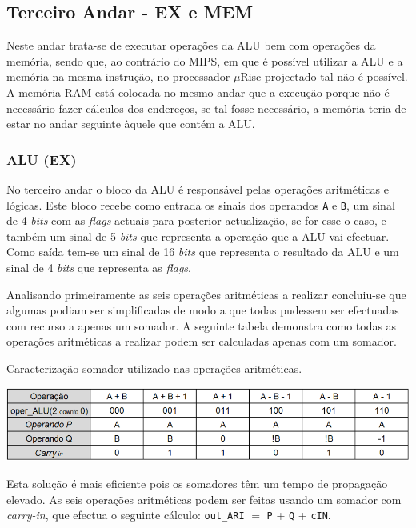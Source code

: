 \documentclass[11pt]{article}
\numberwithin{equation}{section}
\begin{document}
\subsection{Terceiro Andar - EX e MEM}

Neste andar trata-se de executar operações da ALU bem com operações da memória, sendo que, ao contrário do MIPS, em que é possível utilizar a ALU e a memória na mesma instrução, no processador $\mu$Risc projectado tal não é possível. A memória RAM está colocada no mesmo andar que a execução porque não é necessário fazer cálculos dos endereços, se tal fosse necessário, a memória teria de estar no andar seguinte àquele que contém a ALU. 

\subsubsection{ALU (EX)}

No terceiro andar o bloco da ALU é responsável pelas operações aritméticas e lógicas. Este bloco recebe como entrada os sinais dos operandos \texttt{A} e \texttt{B}, um sinal de 4 \textit{bits} com as \textit{flags} actuais para posterior actualização, se for esse o caso, e também um sinal de 5 \textit{bits} que representa a operação que a ALU vai efectuar. Como saída tem-se um sinal de 16 \textit{bits} que representa o resultado da ALU e um sinal de 4 \textit{bits} que representa as \textit{flags}.

Analisando primeiramente as seis operações aritméticas a realizar concluiu-se que algumas podiam ser simplificadas de modo a que todas pudessem ser efectuadas com recurso a apenas um somador. A seguinte tabela demonstra como todas as operações aritméticas a realizar podem ser calculadas apenas com um somador.

\begin{table}[h]
	\centering
	\caption{Caracterização somador utilizado nas operações aritméticas.}
	\vspace{-2mm}
 	\includegraphics[keepaspectratio=true, scale=0.35]{tabelas/adder}
\end{table}

Esta solução é mais eficiente pois os somadores têm um tempo de propagação elevado. As seis operações aritméticas podem ser feitas usando um somador com \textit{carry-in}, que efectua o seguinte cálculo: \texttt{out\_ARI} $=$ \texttt{P} + \texttt{Q} + \texttt{cIN}. 
\end{document}
